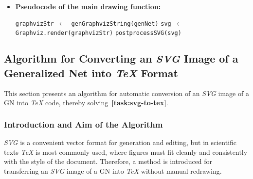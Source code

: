 \begin{itemize}
\begin{algorithm}[H]
\begin{algorithmic}
			\State \texttt{points $\gets$ getTransitionPoints(transition)}
			\State \texttt{topPoint $\gets$ findTopMostPoint(points)}
			\State \texttt{addBlackTriangle(topPoint)}
			\State \texttt{label $\gets$ getTransitionLabel(transition)}
			\State \texttt{placeLabelAboveTriangle(topPoint, label)}
			\EndFor
			
			\State \texttt{circle $\gets$ findCircle(position)}
			\State \texttt{centerPoint $\gets$ getCenterPoint(circle)}
			\State \texttt{label $\gets$ getPositionLabel(position)}
			\State \texttt{placeLabelAboveCircle(centerPoint, label)}
			\EndFor
			
			\State \texttt{outputSVG $\gets$ saveUpdatedSVG(svg)}
			\State \texttt{return outputSVG}
		\end{algorithmic}
	\end{algorithm}
	
	\item \textbf{Pseudocode of the main drawing function:}
	
	\begin{algorithm}[H]
		\caption{drawGenNet(genNet)}
		\begin{algorithmic}
			\State \texttt{graphvizStr $\gets$ genGraphvizString(genNet)}
			\State \texttt{svg $\gets$  Graphviz.render(graphvizStr)}
			\State \texttt{postprocessSVG(svg)}
		\end{algorithmic}
	\end{algorithm}
\end{itemize}

\subsection{Algorithm for Converting an \textit{SVG} Image of a Generalized Net into \textit{TeX} Format}

\hspace*{2.5em}This section presents an algorithm for automatic conversion of an \textit{SVG} image of a GN into \textit{TeX} code, thereby solving~\textbf{\ref{task:svg-to-tex}}.

\subsubsection{Introduction and Aim of the Algorithm}
\hspace*{2.5em}\textit{SVG} is a convenient vector format for generation and editing, but in scientific texts \textit{TeX} is most commonly used, where figures must fit cleanly and consistently with the style of the document. Therefore, a method is introduced for transferring an \textit{SVG} image of a GN into \textit{TeX} without manual redrawing.

